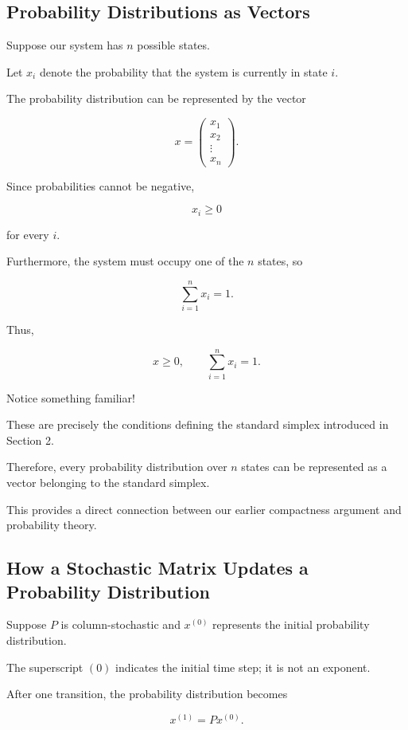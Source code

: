 \documentclass[11pt,a4paper]{article}
\theoremstyle{definition}
\theoremstyle{remark}
\begin{document}
\subsection{Probability Distributions as Vectors}

Suppose our system has $n$
possible states.

Let $x_i$ denote the probability
that the system is currently
in state $i$.

The probability distribution
can be represented by the vector

\[
x=
\begin{pmatrix}
x_1\\
x_2\\
\vdots\\
x_n
\end{pmatrix}.
\]

Since probabilities cannot
be negative,

\[
x_i\geq0
\]

for every $i$.

Furthermore, the system
must occupy one of the
$n$ states, so

\[
\sum_{i=1}^{n}x_i=1.
\]

Thus,

\[
\boxed{
x\geq0,
\qquad
\sum_{i=1}^{n}x_i=1.
}
\]

Notice something familiar!

These are precisely the
conditions defining the
standard simplex introduced
in Section 2.

Therefore, every probability
distribution over $n$ states
can be represented as a
vector belonging to the
standard simplex.

This provides a direct
connection between our earlier
compactness argument and
probability theory.

\subsection{How a Stochastic Matrix
Updates a Probability Distribution}

Suppose $P$ is column-stochastic
and $x^{(0)}$ represents the
initial probability distribution.

The superscript $(0)$ indicates
the initial time step; it is
not an exponent.

After one transition,
the probability distribution
becomes

\begin{equation}
x^{(1)}=Px^{(0)}.
\label{eq:markov_one_step}
\end{equation}
\end{document}
